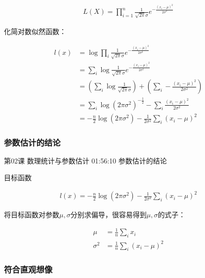 \documentclass[UTF8]{ctexart}
\begin{document}
\begin{equation}
\begin{aligned}
L(X)=\prod_{i=1}^{n} \frac{1}{\sqrt{2\pi}\sigma} e ^{-\frac{(x_{i}-\mu)^{2}}{2\sigma^{2}}}
\end{aligned}
\end{equation}

化简对数似然函数：

\begin{equation}
\begin{aligned}
l(x)&=\log \prod_{i} \frac{1}{\sqrt{2\pi}\sigma} e ^{-\frac{(x_{i}-\mu)^{2}}{2\sigma^{2}}} \\
&=\sum_{i} \log \frac{1}{\sqrt{2\pi}\sigma} e ^{-\frac{(x_{i}-\mu)^{2}}{2\sigma^{2}}} \\
&= \left (  \sum_{i} \log \frac{1}{\sqrt{2\pi}\sigma}  \right ) + \left (  \sum_{i} -\frac{(x_{i}-\mu)^{2}}{2\sigma^{2}}  \right ) \\
&= \sum_{i} \log (2\pi \sigma^{2})^{-\frac{1}{2}} -\sum_{i} \frac{(x_{i}-\mu)^{2}}{2\sigma^{2}} \\
&=-\frac{n}{2} \log (2\pi \sigma^{2}) - \frac{1}{2 \sigma^{2}}\sum_{i}(x_{i}-\mu)^{2}
\end{aligned}
\end{equation}

\subsubsection{参数估计的结论}

第02课 数理统计与参数估计 01:56:10 参数估计的结论

目标函数

\begin{equation}
\begin{aligned}
l(x)=-\frac{n}{2} \log (2\pi \sigma^{2}) - \frac{1}{2 \sigma^{2}}\sum_{i}(x_{i}-\mu)^{2}
\end{aligned}
\end{equation}

将目标函数对参数$\mu,\sigma$分别求偏导，很容易得到$\mu,\sigma$的式子：

\begin{equation}
\begin{aligned}
\mu &= \frac{1}{n} \sum_{i} x_{i} \\
\sigma^{2} &=\frac{1}{n}\sum_{i} (x_{i}-\mu)^{2}
\end{aligned}
\end{equation}

\subsubsection{符合直观想像}
\end{document}
